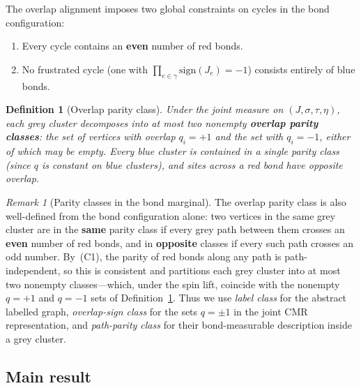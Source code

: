 \documentclass[11pt]{article}
\newtheorem{definition}[theorem]{Definition}
\numberwithin{theorem}{section}
\theoremstyle{remark}
\newtheorem{remark}[theorem]{Remark}
\begin{document}
The overlap alignment imposes two global constraints on cycles in the bond configuration:
\begin{enumerate}
\item[(C1)] Every cycle contains an \textbf{even} number of red bonds.
\item[(C2)] No frustrated cycle (one with $\prod_{e \in \gamma} \mathrm{sign}(J_e) = -1$) consists entirely of blue bonds.
\end{enumerate}

\begin{definition}[Overlap parity class]\label{def:parity}
Under the joint measure on $(J, \sigma, \tau, \eta)$, each grey cluster decomposes into at most two nonempty \textbf{overlap parity classes}: the set of vertices with overlap $q_i = +1$ and the set with $q_i = -1$, either of which may be empty.
Every blue cluster is contained in a single parity class (since $q$ is constant on blue clusters), and sites across a red bond have opposite overlap.
\end{definition}

\begin{remark}[Parity classes in the bond marginal]\label{rem:parity-marginal}
The overlap parity class is also well-defined from the bond configuration alone: two vertices in the same grey cluster are in the \textbf{same} parity class if every grey path between them crosses an \textbf{even} number of red bonds, and in \textbf{opposite} classes if every such path crosses an odd number.
By~(C1), the parity of red bonds along any path is path-independent, so this is consistent and partitions each grey cluster into at most two nonempty classes---which, under the spin lift, coincide with the nonempty $q = +1$ and $q = -1$ sets of Definition~\ref{def:parity}.
Thus we use \emph{label class} for the abstract labelled graph, \emph{overlap-sign class} for the sets $q=\pm1$ in the joint CMR representation, and \emph{path-parity class} for their bond-measurable description inside a grey cluster.
\end{remark}

\subsection{Main result}
\end{document}
